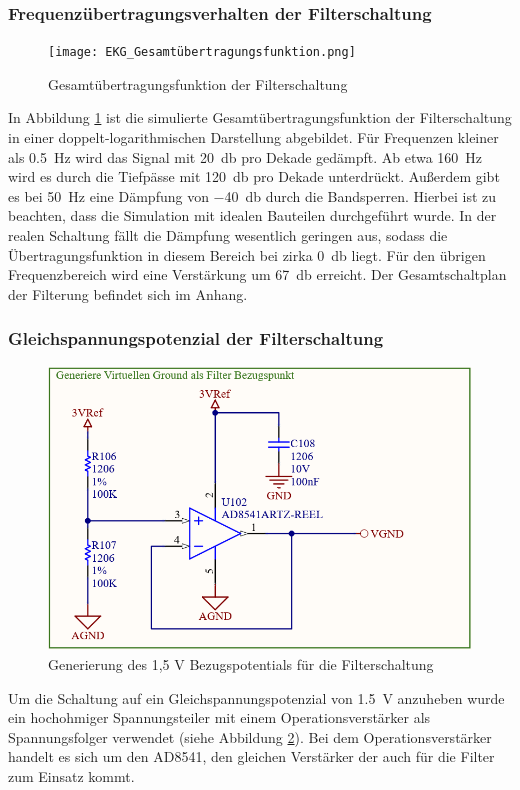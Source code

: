\subsubsection{Frequenzübertragungsverhalten der Filterschaltung}

\begin{figure} [!h]
	\texttt{[image: EKG\_Gesamtübertragungsfunktion.png]}
	\caption{Gesamtübertragungsfunktion der Filterschaltung}
	\label{Bodediagramm Filterschaltung} 
\end{figure}

In Abbildung \ref{Bodediagramm Filterschaltung} ist die simulierte Gesamtübertragungsfunktion der Filterschaltung in einer doppelt-logarithmischen Darstellung abgebildet. Für Frequenzen kleiner als \SI{0,5}{\hertz} wird das Signal mit \SI{20}{\decibel} pro Dekade gedämpft. Ab etwa \SI{160}{\hertz} wird es durch die Tiefpässe mit \SI{120}{\decibel} pro Dekade unterdrückt. Außerdem gibt es bei \SI{50}{\hertz} eine Dämpfung von \SI{-40}{\decibel} durch die Bandsperren. Hierbei ist zu beachten, dass die Simulation mit idealen Bauteilen durchgeführt wurde. In der realen Schaltung fällt die Dämpfung wesentlich geringen aus, sodass die Übertragungsfunktion in diesem Bereich bei zirka \SI{0}{\decibel} liegt. Für den übrigen Frequenzbereich wird eine Verstärkung um \SI{67}{\decibel} erreicht. Der Gesamtschaltplan der Filterung befindet sich im Anhang.  %

\subsubsection{Gleichspannungspotenzial der Filterschaltung}

\begin{figure} [!h]
	\includegraphics[width=\textwidth] {EKG_virtueller_Ground.png}
	\caption{Generierung des 1,5 V Bezugspotentials für die Filterschaltung}
	\label{Virtueller GND} 
\end{figure}

Um die Schaltung auf ein Gleichspannungspotenzial von \SI{1,5}{\volt} anzuheben wurde ein hochohmiger Spannungsteiler mit einem Operationsverstärker als Spannungsfolger verwendet (siehe Abbildung \ref{Virtueller GND}). Bei dem Operationsverstärker handelt es sich um den AD8541, den gleichen Verstärker der auch für die Filter zum Einsatz kommt.




